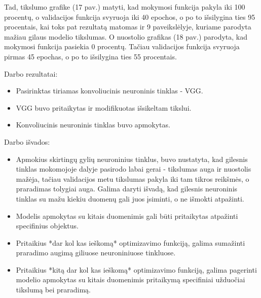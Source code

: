 \documentclass{VUMIFPSkursinis}
\begin{document}
Tad, tikslumo grafike (17 pav.) matyti, kad mokymosi funkcija pakyla iki 100 procentų, o validacijos funkcija svyruoja iki 40 epochos, o po to išsilygina ties 95 procentais, kai toks pat rezultatą matomas ir 9 paveikslėlyje, kuriame parodyta mažiau gilaus modelio tikslumas.
O nuostolio grafikas (18 pav.) parodyta, kad mokymosi funkcija pasiekia 0 procentų. Tačiau validacijos funkcija svyruoja pirmas 45 epochas, o po to išsilygina ties 55 procentais.

Darbo rezultatai:
\begin{itemize}
\item Pasirinktas tiriamas konvoliucinis neuroninis tinklas - VGG.
\item VGG buvo pritaikytas ir modifikuotas išsikeltam tikslui.
\item Konvoliucinis neuroninis tinklas buvo apmokytas.
\end{itemize}


Darbo išvados:
\begin{itemize}
\item Apmokius skirtingų gylių neuroninius tinklus, buvo nustatyta, kad gilesnis tinklas mokomojoje dalyje pasirodo labai gerai - tikslumas auga ir nuostolis mažėja, tačiau 
validacijos metu tikslumas pakyla iki tam tikros reikšmės, o praradimas tolygiai auga. Galima daryti išvadą, kad gilesnis neuroninis tinklas su mažu kiekiu duomenų gali juos 
įsiminti, o ne išmokti atpažinti.
\item Modelis apmokytas su kitais duomenimis gali būti pritaikytas atpažinti specifinius objektus.
\item Pritaikius *dar kol kas ieškomą* optimizavimo funkciją, galima sumažinti praradimo augimą giliuose neuroniniuose tinkluose.
\item Pritaikius *kitą dar kol kas ieškomą* optimizavimo funkciją, galima pagerinti modelio apmokytas su kitais duomenimis pritaikymą specifiniai užduočiai tikslumą bei praradimą.
\end{itemize}

\printbibliography[heading=bibintoc] 
\end{document}
